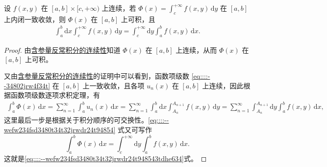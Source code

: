 \documentclass[../../main.tex]{subfiles}%
\begin{document}
\begin{theorem}[可积性]\label{theorem:含参量反常积分可积性定理}
设 \( f(x,y) \) 在 \( [a,b] \times [c, +\infty) \) 上连续，若 \( \Phi(x) = \int_{c}^{+\infty} f(x,y) \, \mathrm{d}y \) 在 \( [a,b] \) 上内闭一致收敛，则 \( \Phi(x) \) 在 \( [a,b] \) 上可积，且
\begin{align}\label{eq::::--wefw234fsd3480t34t32jrwdr24t948543tdhe634}
\int_{a}^{b} \mathrm{d}x \int_{c}^{+\infty} f(x,y) \, \mathrm{d}y = \int_{c}^{+\infty} \mathrm{d}y \int_{a}^{b} f(x,y) \, \mathrm{d}x.
\end{align}
\end{theorem}
\begin{proof}
由\hyperref[theorem:含参量反常积分的连续性]{含参量反常积分的连续性}知道 \( \Phi(x) \) 在 \( [a,b] \) 上连续，从而 \( \Phi(x) \) 在 \( [a,b] \) 上可积。

又由\hyperref[theorem:含参量反常积分的连续性]{含参量反常积分的连续性}的证明中可以看到，函数项级数 \eqref{eq::::--34802jrw4f34t} 在 \( [a,b] \) 上一致收敛，且各项 \( u_n(x) \) 在 \( [a,b] \) 上连续，因此根据函数项级数逐项求积定理，有
\begin{align}\label{eq::::--wefw234fsd3480t34t32jrwdr24t94854}
\int_{a}^{b} \Phi(x) \, \mathrm{d}x = \sum_{n=1}^{\infty} \int_{a}^{b} u_n(x) \, \mathrm{d}x = \sum_{n=1}^{\infty} \int_{a}^{b} \mathrm{d}x \int_{A_n}^{A_{n+1}} f(x,y) \, \mathrm{d}y = \sum_{n=1}^{\infty} \int_{A_n}^{A_{n+1}} \mathrm{d}y \int_{a}^{b} f(x,y) \, \mathrm{d}x,
\end{align}
这里最后一步是根据关于积分顺序的可交换性。\eqref{eq::::--wefw234fsd3480t34t32jrwdr24t94854} 式又可写作
\[
\int_{a}^{b} \Phi(x) \, \mathrm{d}x = \int_{c}^{+\infty} \mathrm{d}y \int_{a}^{b} f(x,y) \, \mathrm{d}x.
\]
这就是\eqref{eq::::--wefw234fsd3480t34t32jrwdr24t948543tdhe634}式。
\end{proof}
\end{document}
